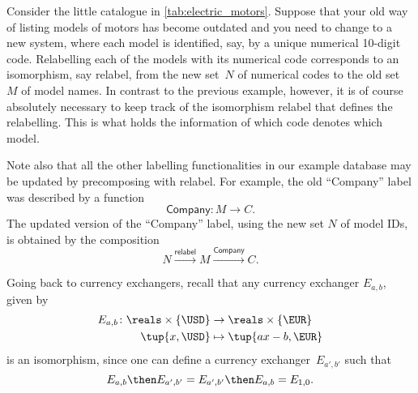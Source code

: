 
\begin{example}[Relabelling]
Consider the little catalogue in \cref{tab:electric_motors}. Suppose that your old way of listing models of motors has become outdated and you need to change to a new system, where each model is identified, say, by a unique numerical 10-digit code. Relabelling each of the models with its numerical code corresponds to an isomorphism, say \textsf{relabel}, from the new set~$N$ of numerical codes to the old set~$M$ of model names. In contrast to the previous example, however, it is of course absolutely necessary to keep track of the isomorphism \textsf{relabel} that defines the relabelling. This is what holds the information of which code denotes which model.

Note also that all the other labelling functionalities in our example database may be updated by precomposing with \textsf{relabel}. For example, the old ``Company'' label was described by a function
\begin{equation*}
\textsf{Company}\colon M \to C.
\end{equation*}
The updated version of the ``Company'' label, using the new set $N$ of model IDs, is obtained by the composition
\begin{equation*}
N \overset{\textsf{relabel}}{\longrightarrow} M \overset{\textsf{Company}}{\longrightarrow} C.
\end{equation*}
\end{example}

\begin{example}
Going back to currency exchangers, recall that any currency exchanger $E_{a,b}$, given by
\begin{equation*}
\begin{aligned}
E_{a,b}\colon \reals\times \{\USD\}&\to \reals\times \{\EUR\}\\
\tup{x,\USD}&\mapsto \tup{ax-b,\EUR}
\end{aligned}
\end{equation*}
is an isomorphism, since one can define a currency exchanger~$E_{a',b'}$ such that
\begin{equation*}
E_{a,b}\then E_{a',b'}=E_{a',b'}\then E_{a,b}=E_{1,0}.
\end{equation*}
\end{example}


